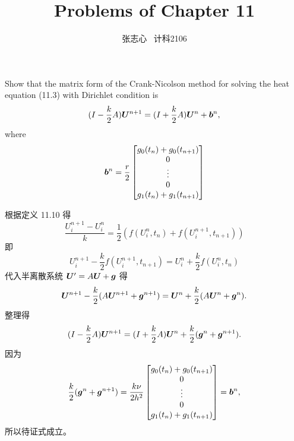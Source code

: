 \documentclass[lang=cn,a4paper,newtx,bibend=bibtex]{elegantpaper}
\title{Problems of Chapter 11}
\author{张志心 \ 计科2106}
\date{\zhdate{2024/06/11}}
\begin{document}
\maketitle

\begin{prob}[Exercise 11.11]
  Show that the matrix form of the Crank-Nicolson method
  for solving the heat equation (11.3) with Dirichlet condition is
  \begin{equation*}
    (I-\frac k2A) \bm{U}^{n+1} = (I+\frac k2A) \bm{U}^n + \bm{b}^n,
  \end{equation*}
  where
  \begin{equation*}
    \bm{b}^n = \frac r2
    \begin{bmatrix} 
      g_0(t_n) + g_0(t_{n+1}) \\
      0 \\
      \vdots \\
      0 \\
      g_1(t_n) + g_1(t_{n+1}) \\
     \end{bmatrix}
  \end{equation*}
\end{prob}

\begin{solution}
  根据定义 11.10 得
  \begin{equation*}
    \dfrac{U_i^{n+1} - U_i^n}k = \frac 12\left(f(U_i^n, t_n) + f(U_i^{n+1}, t_{n+1})\right)
  \end{equation*}
  即
  \begin{equation*}
    U_i^{n+1} - \frac k2 f(U_i^{n+1}, t_{n+1}) = U_i^n + \frac k2 f(U_i^n, t_n)
  \end{equation*}
  代入半离散系统 $\bm{U}' = A\bm{U} + \bm{g}$ 得
  \begin{equation*}
    \bm{U}^{n+1} - \frac k2 (A\bm{U}^{n+1} + \bm{g}^{n+1}) = \bm{U}^n + \frac k2 (A\bm{U}^n + \bm{g}^n).
  \end{equation*}
  整理得
  \begin{equation*}
    (I - \frac k2 A)\bm{U}^{n+1} = (I + \frac k2 A)\bm{U}^n + \frac k2(\bm{g}^n + \bm{g}^{n+1}).
  \end{equation*}
  因为
  \begin{equation*}
    \frac k2(\bm{g}^n + \bm{g}^{n+1}) = \frac {k\nu}{2h^2}
    \begin{bmatrix}  g_0(t_n) + g_0(t_{n+1}) \\ 0 \\ \vdots \\ 0 \\ g_1(t_n) + g_1(t_{n+1}) \end{bmatrix}
    = \bm{b}^n,
  \end{equation*}
  所以待证式成立。
\end{solution}
\end{document}
